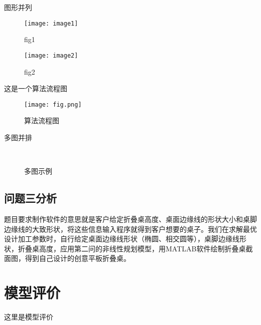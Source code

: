 \documentclass[bwprint,fontset=windows]{gmcmthesis}
\begin{document}
图形并列
\begin{figure}[htp!]
\begin{minipage}[t]{0.48\linewidth}
\centering
\texttt{[image: image1]}
\caption{fig1}
\label{fig:side:a}
\end{minipage}%
\begin{minipage}[t]{0.48\linewidth}
\centering
\texttt{[image: image2]}  %
\caption{fig2}
\label{fig:side:b}
\end{minipage}
\end{figure}


\clearpage
这是一个算法流程图
\begin{figure}[htp!]
\centering
\texttt{[image: fig.png]}
\caption{算法流程图}
\end{figure}

多图并排
\begin{figure}[!htp]
  \centering
  \qquad
   \\
  \qquad
  \caption{多图示例}
\end{figure}


\subsection{问题三分析}


题目要求制作软件的意思就是客户给定折叠桌高度、桌面边缘线的形状大小和桌脚边缘线的大致形状，将这些信息输入程序就得到客户想要的桌子。我们在求解最优设计加工参数时，自行给定桌面边缘线形状（椭圆、相交圆等），桌脚边缘线形状，折叠桌高度，应用第二问的非线性规划模型，用MATLAB软件绘制折叠桌截面图，得到自己设计的创意平板折叠桌。


\section{模型评价}

这里是模型评价




\cite{mittelbach_latex_2004,wright_latex3_2009,beeton_unicode_2008,vieth_experiences_2009}
\end{document}
